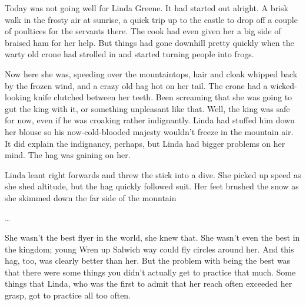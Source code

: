 Today was not going well for Linda Greene.
It had started out alright.
A brisk walk in the frosty air at sunrise, a quick trip up to the castle to drop off a couple of poultices for the servants there.
The cook had even given her a big side of braised ham for her help.
But things had gone downhill pretty quickly when the warty old crone had strolled in and started turning people into frogs.

Now here she was, speeding over the mountaintops, hair and cloak whipped back by the frozen wind, and a crazy old hag hot on her tail.
The crone had a wicked-looking knife clutched between her teeth.
Been screaming that she was going to gut the king with it, or something unpleasant like that.
Well, the king was safe for now, even if he was croaking rather indignantly.
Linda had stuffed him down her blouse so his now-cold-blooded majesty wouldn't freeze in the mountain air.
It did explain the indignancy, perhaps, but Linda had bigger problems on her mind.
The hag was gaining on her.

Linda leant right forwards and threw the stick into a dive.
She picked up speed as she shed altitude, but the hag quickly followed suit.
Her feet brushed the snow as she skimmed down the far side of the mountain

\dots %

She wasn't the best flyer in the world, she knew that.
She wasn't even the best in the kingdom; young Wren up Salwich way could fly circles around her.
And this hag, too, was clearly better than her.
But the problem with being the best was that there were some things you didn't actually get to practice that much.
Some things that Linda, who was the first to admit that her reach often exceeded her grasp, got to practice all too often.

